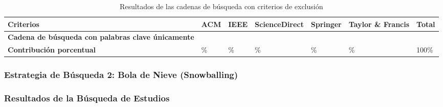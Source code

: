 \begin{table}[htbp]
    \centering
    \caption{Resultados de las cadenas de búsqueda con criterios de exclusión}
    \label{table:search_results_exclusion}
    \begin{tabular}{p{4.5cm}p{1.5cm}p{1.5cm}p{2cm}p{1.8cm}p{1.8cm}p{1.5cm}}
        \toprule
        \textbf{Criterios}                                        & \textbf{ACM} & \textbf{IEEE} & \textbf{ScienceDirect} & \textbf{Springer} & \textbf{Taylor \& Francis} & \textbf{Total} \\
        \midrule
        \textbf{Cadena de búsqueda con palabras clave únicamente} & \iacm{}      & \iieee{}      & \isd{}                 & \ispr{}           & \itf{}                     & \itot{}        \\
        \addlinespace[0.8em]
        \textbf{Contribución porcentual}                          & \iacmp{}\%   & \iieeep{}\%   & \isdp{}\%              & \isprp{}\%        & \itfp{}\%                  & 100\%          \\
        \bottomrule
    \end{tabular}
\end{table}


\subsubsection{Estrategia de Búsqueda 2: Bola de Nieve (Snowballing)}


\subsubsection{Resultados de la Búsqueda de Estudios}\label{subsubsec:resultados-busqueda}


